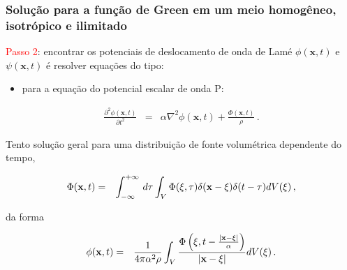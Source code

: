 \documentclass[xcolor=table]{beamer}
\newcommand{\xvec}{\mathbf{x}}
\newcommand{\xivec}{\boldmath \xi}
\begin{document}
\begin{frame}
\frametitle{\textbf{Solu\c{c}\~ao para a fun\c{c}\~ao de Green em um meio homog\^eneo, isotr\'opico e ilimitado}}

\begin{flushleft}
 \textcolor{red}{Passo 2}:\hspace{0.025cm} encontrar os potenciais de deslocamento de onda de Lam\'e $\phi(\xvec,t)$ e $\psi(\xvec,t)$ \'e resolver equa\c{c}\~oes do tipo:\\ 
\end{flushleft}
\begin{itemize}
  \item para a equa\c{c}\~ao do potencial escalar de onda P: 
 \end{itemize} 
\begin{eqnarray}
  \label{ten1}  
       \frac{\partial^2 \phi(\xvec,t)}{\partial t^2} &=& \alpha \nabla^2 \phi(\xvec,t) + \frac{\Phi(\xvec,t)}{\rho} \, .
 \end{eqnarray}
 
\begin{flushleft}
Tento solu\c{c}\~ao geral para uma distribui\c{c}\~ao de fonte volum\'etrica dependente do tempo,
\end{flushleft}
\begin{eqnarray}
 \Phi(\xvec,t) &=&  \int_{-\infty}^{+\infty}\, d\tau \int_{V} \Phi(\xivec,\tau)\delta(\xvec -\xivec)\delta(t -\tau) dV(\xivec)\, ,
\end{eqnarray}
\begin{flushleft}
da forma
\end{flushleft}
\begin{eqnarray}
 \phi(\xvec,t) &=& \frac{1}{4\pi\alpha^{2} \rho} \int_{V} \frac{ \Phi \left( \xivec,t - \frac{\left|\xvec - \xivec \right|}{\alpha}  \right) }{\left|\xvec - \xivec \right|} dV(\xivec)\, .
\end{eqnarray} 
 
\end{frame}%
\end{document}
